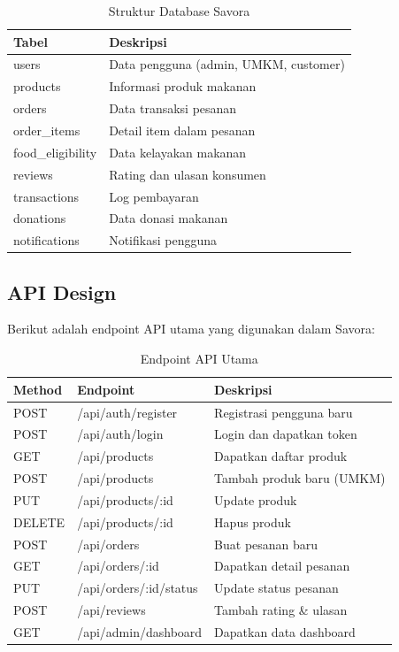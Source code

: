 \begin{table}[H]
\centering
\caption{Struktur Database Savora}
\label{tab:database}
\small
\begin{tabularx}{\textwidth}{|l|X|}
\hline
\textbf{Tabel} & \textbf{Deskripsi} \\
\hline
users & Data pengguna (admin, UMKM, customer) \\
\hline
products & Informasi produk makanan \\
\hline
orders & Data transaksi pesanan \\
\hline
order\_items & Detail item dalam pesanan \\
\hline
food\_eligibility & Data kelayakan makanan \\
\hline
reviews & Rating dan ulasan konsumen \\
\hline
transactions & Log pembayaran \\
\hline
donations & Data donasi makanan \\
\hline
notifications & Notifikasi pengguna \\
\hline
\end{tabularx}
\end{table}

\subsection{API Design}

Berikut adalah endpoint API utama yang digunakan dalam Savora:

\begin{table}[H]
\centering
\caption{Endpoint API Utama}
\label{tab:api}
\small
\begin{tabularx}{\textwidth}{|l|l|X|}
\hline
\textbf{Method} & \textbf{Endpoint} & \textbf{Deskripsi} \\
\hline
POST & /api/auth/register & Registrasi pengguna baru \\
\hline
POST & /api/auth/login & Login dan dapatkan token \\
\hline
GET & /api/products & Dapatkan daftar produk \\
\hline
POST & /api/products & Tambah produk baru (UMKM) \\
\hline
PUT & /api/products/:id & Update produk \\
\hline
DELETE & /api/products/:id & Hapus produk \\
\hline
POST & /api/orders & Buat pesanan baru \\
\hline
GET & /api/orders/:id & Dapatkan detail pesanan \\
\hline
PUT & /api/orders/:id/status & Update status pesanan \\
\hline
POST & /api/reviews & Tambah rating \& ulasan \\
\hline
GET & /api/admin/dashboard & Dapatkan data dashboard \\
\hline
\end{tabularx}
\end{table}

